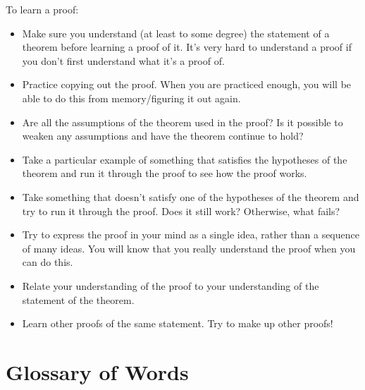 \documentclass[12pt]{article}
\begin{document}
To learn a proof:
\begin{itemize}
  \item Make sure you understand (at least to some degree) the
    statement of a theorem before learning a proof of it.  It's very
    hard to understand a proof if you don't first understand what it's
    a proof of. 
  \item Practice copying out the proof.  When you are practiced
    enough, you will be able to do this from memory/figuring it out
    again. 
  \item Are all the assumptions of the theorem used in the proof?  Is
    it possible to weaken any assumptions and have the theorem
    continue to hold? 
  \item Take a particular example of something that satisfies the
    hypotheses of the theorem and run it through the proof to see how
    the proof works. 
  \item Take something that doesn't satisfy one of the hypotheses of
    the theorem and try to run it through the proof.  Does it still
    work? Otherwise, what fails? 
  \item Try to express the proof in your mind as a single idea, rather
    than a sequence of many ideas.  You will know that you really
    understand the proof when you can do this.
  \item Relate your understanding of the proof to your understanding
    of the statement of the theorem. 
  \item Learn other proofs of the same statement.  Try to make up other proofs!
\end{itemize}

\section{Glossary of Words}
\end{document}
